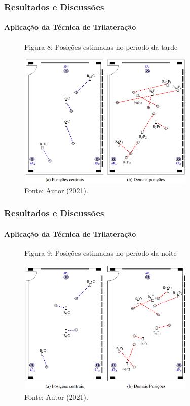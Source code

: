 \documentclass[xcolor={dvipsnames,svgnames,table}]{beamer}
\begin{document}
	\begin{frame}
		\frametitle{Resultados e Discussões}
		\framesubtitle{Aplicação da Técnica de Trilateração}
		\begin{figure}
			\caption*{Figura 8: Posições estimadas no período da tarde}
			\vspace{-5pt}
			\centering
			\includegraphics[width=8.5cm, height=6.5cm]{imgs/tarde.PNG}
			\vspace{-5pt}
			\caption*{\tiny{Fonte: Autor (2021).}}
		\end{figure}
	\end{frame}

	\begin{frame}
		\frametitle{Resultados e Discussões}
		\framesubtitle{Aplicação da Técnica de Trilateração}
		\begin{figure}
			\caption*{Figura 9: Posições estimadas no período da noite}
			\vspace{-5pt}
			\centering
			\includegraphics[width=8.5cm, height=6.5cm]{imgs/noite.PNG}
			\vspace{-5pt}
			\caption*{\tiny{Fonte: Autor (2021).}}
		\end{figure}
	\end{frame}
\end{document}

